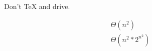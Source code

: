 \documentclass[14pt]{extarticle} %
\begin{document}
Don't \TeX{} and drive.

\begin{gather}
  \Theta(n^2) \\
  \Theta(n^2 * 2^{n^2})
\end{gather}
\end{document}
